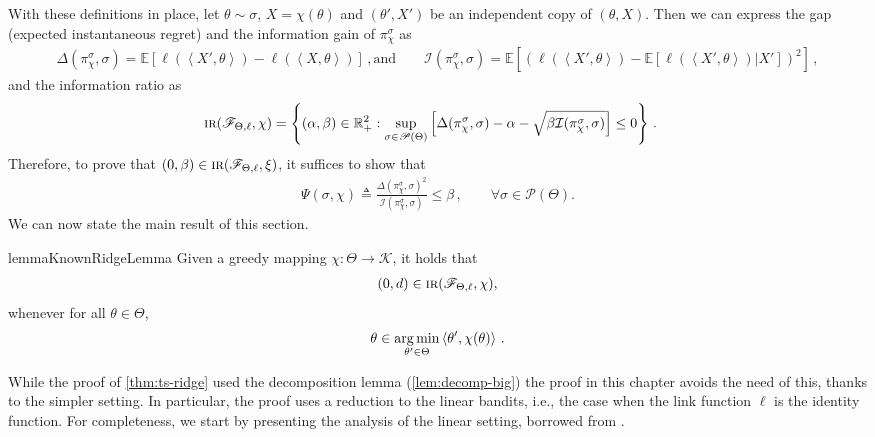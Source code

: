 \documentclass[letter, 12pt]{report}
\newcommand{\R}{\mathbb R}
\newcommand{\argmin}{\operatornamewithlimits{arg\,min}}
\newcommand{\ip}[1]{\left \langle #1 \right \rangle}
\newcommand{\E}{\mathbb E}
\newcommand{\cK}{\mathcal K}
\newcommand{\sF}{\mathscr F}
\newcommand{\cI}{\mathcal I}
\newcommand{\sP}{\mathscr P}
\newcommand{\I}{\mathcal{I}}
\newcommand{\1}{\mathbf{1}}
\newcommand{\IR}{\operatorname{\textsc{ir}}}
\theoremstyle{plain}
\theoremstyle{definition}
\theoremstyle{remark}
\begin{document}
With these definitions in place, let $\theta \sim \sigma$, $X=\chi(\theta)$ and $(\theta', X')$
be an independent copy of $(\theta, X)$.
Then we can express the gap (expected instantaneous regret) and the information gain of $\pi_\chi^\sigma$ as
\begin{align*}
    \Delta(\pi^\sigma_\chi, \sigma)
    = \E\left[\ell\left(\ip{X', \theta}\right) - \ell\left(\ip{X, \theta}\right)\right]\,, \text{and}                      \qquad
    \cI(\pi^\sigma_\chi, \sigma)
    = \E\left[\left(\ell\left(\ip{X', \theta}\right) - \E\left[\ell\left(\ip{X', \theta}\right)|X'\right]\right)^2\right]\,,
\end{align*}
and the information ratio as
\begin{align}
    \IR(\sF_{\Theta, \ell}, \chi) & = \left\{(\alpha, \beta) \in \R_+^2 : \sup_{\sigma \in \sP(\Theta)} \left[\Delta(\pi^\sigma_\chi, \sigma) - \alpha - \sqrt{\beta \I(\pi^\sigma_\chi, \sigma)}\right] \leq 0 \right\}\,. \nonumber
\end{align}
Therefore, to prove that $(0, \beta) \in \IR(\sF_{\Theta, \ell}, \xi)$, it suffices to show that
\begin{align}
    \Psi(\sigma, \chi) \triangleq
    \frac{\Delta(\pi^\sigma_\chi, \sigma)^2}{\I(\pi^\sigma_\chi, \sigma)} \leq \beta\,,\qquad \forall \sigma \in \sP(\Theta).
    \label{eq:IR-alpha-0}
\end{align}
We can now state the main result of this section.

\begin{restatable}{lemma}{KnownRidgeLemma}
    \label{thm:ridge-known-ir}
    Given a greedy mapping $\chi: \Theta \to \cK$, it holds that
    \begin{align*}
        (0, d) \in \IR(\sF_{\Theta, \ell}, \chi),
    \end{align*}
    whenever for all $\theta \in \Theta$,
    \begin{align*}
        \theta \in \argmin_{\theta' \in \Theta} \ip{\theta', \chi(\theta)}\,.
    \end{align*}
\end{restatable}
While the proof of \cref{thm:ts-ridge} used the decomposition lemma (\cref{lem:decomp-big}) the proof in this chapter avoids the need of this, thanks to the simpler setting.
In particular, the proof uses a reduction to the linear bandits, i.e., the case when the link function $\ell$ is the identity function.
For completeness, we start by presenting the analysis of the linear setting, borrowed from \cite{RV16}.
\end{document}
